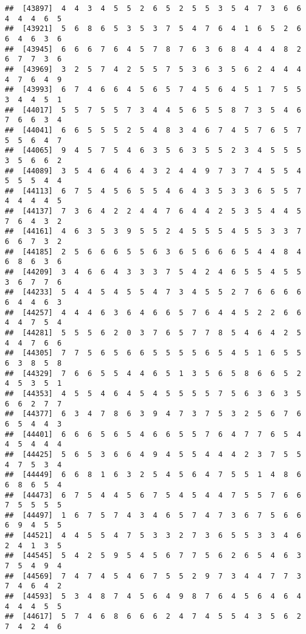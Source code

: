\documentclass[
]{book}
\begin{document}
\begin{verbatim}
##  [43897]  4  4  3  4  5  5  2  6  5  2  5  5  3  5  4  7  3  6  6  4  4  4  6  5
##  [43921]  5  6  8  6  5  3  5  3  7  5  4  7  6  4  1  6  5  2  6  6  4  6  3  6
##  [43945]  6  6  6  7  6  4  5  7  8  7  6  3  6  8  4  4  4  8  2  6  7  7  3  6
##  [43969]  3  2  5  7  4  2  5  5  7  5  3  6  3  5  6  2  4  4  4  4  7  6  4  9
##  [43993]  6  7  4  6  6  4  5  6  5  7  4  5  6  4  5  1  7  5  5  3  4  4  5  1
##  [44017]  5  5  7  5  5  7  3  4  4  5  6  5  5  8  7  3  5  4  6  7  6  6  3  4
##  [44041]  6  6  5  5  5  2  5  4  8  3  4  6  7  4  5  7  6  5  7  5  5  6  4  7
##  [44065]  9  4  5  7  5  4  6  3  5  6  3  5  5  2  3  4  5  5  5  3  5  6  6  2
##  [44089]  3  5  4  6  4  6  4  3  2  4  4  9  7  3  7  4  5  5  4  5  5  5  4  4
##  [44113]  6  7  5  4  5  6  5  5  4  6  4  3  5  3  3  6  5  5  7  4  4  4  4  5
##  [44137]  7  3  6  4  2  2  4  4  7  6  4  4  2  5  3  5  4  4  5  7  6  4  3  2
##  [44161]  4  6  3  5  3  9  5  5  2  4  5  5  5  4  5  5  3  3  7  6  6  7  3  2
##  [44185]  2  5  6  6  6  5  5  6  3  6  5  6  6  6  5  4  4  8  4  6  8  6  3  6
##  [44209]  3  4  6  6  4  3  3  3  7  5  4  2  4  6  5  5  4  5  5  3  6  7  7  6
##  [44233]  5  4  4  5  4  5  5  4  7  3  4  5  5  2  7  6  6  6  6  6  4  4  6  3
##  [44257]  4  4  4  6  3  6  4  6  6  5  7  6  4  4  5  2  2  6  6  4  4  7  5  4
##  [44281]  5  5  5  6  2  0  3  7  6  5  7  7  8  5  4  6  4  2  5  4  4  7  6  6
##  [44305]  7  7  5  6  5  6  6  5  5  5  5  6  5  4  5  1  6  5  5  6  3  8  5  8
##  [44329]  7  6  6  5  5  4  4  6  5  1  3  5  6  5  8  6  6  5  2  4  5  3  5  1
##  [44353]  4  5  5  4  6  4  5  4  5  5  5  5  7  5  6  3  6  3  5  6  6  2  7  7
##  [44377]  6  3  4  7  8  6  3  9  4  7  3  7  5  3  2  5  6  7  6  6  5  4  4  3
##  [44401]  6  6  6  5  6  5  4  6  6  5  5  7  6  4  7  7  6  5  4  4  5  4  4  4
##  [44425]  5  6  5  3  6  6  4  9  4  5  5  4  4  4  2  3  7  5  5  4  7  5  3  4
##  [44449]  6  6  8  1  6  3  2  5  4  5  6  4  7  5  5  1  4  8  6  6  8  6  5  4
##  [44473]  6  7  5  4  4  5  6  7  5  4  5  4  4  7  5  5  7  6  6  7  5  5  5  5
##  [44497]  1  6  7  5  7  4  3  4  6  5  7  4  7  3  6  7  5  6  6  6  9  4  5  5
##  [44521]  4  4  5  5  4  7  5  3  3  2  7  3  6  5  5  3  3  4  6  2  4  1  3  5
##  [44545]  5  4  2  5  9  5  4  5  6  7  7  5  6  2  6  5  4  6  3  7  5  4  9  4
##  [44569]  7  4  7  4  5  4  6  7  5  5  2  9  7  3  4  4  7  7  3  7  4  6  4  2
##  [44593]  5  3  4  8  7  4  5  6  4  9  8  7  6  4  5  6  4  6  4  4  4  4  5  5
##  [44617]  5  7  4  6  8  6  6  6  2  4  7  4  5  5  4  3  5  6  2  7  4  2  4  6

\end{verbatim}
\end{document}
